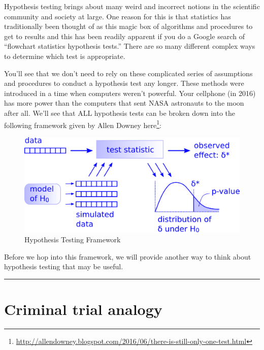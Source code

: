 \documentclass[12pt, krantz2,]{krantz}
\renewcommand{\href}[2]{#2\footnote{\url{#1}}}
\begin{document}
Hypothesis testing brings about many weird and incorrect notions in the scientific community and society at large. One reason for this is that statistics has traditionally been thought of as this magic box of algorithms and procedures to get to results and this has been readily apparent if you do a Google search of ``flowchart statistics hypothesis tests.'' There are so many different complex ways to determine which test is appropriate.

You'll see that we don't need to rely on these complicated series of assumptions and procedures to conduct a hypothesis test any longer. These methods were introduced in a time when computers weren't powerful. Your cellphone (in 2016) has more power than the computers that sent NASA astronauts to the moon after all. We'll see that ALL hypothesis tests can be broken down into the following framework given by Allen Downey \href{http://allendowney.blogspot.com/2016/06/there-is-still-only-one-test.html}{here}:

\begin{figure}

{\centering \includegraphics[width=\textwidth]{images/ht} 

}

\caption{Hypothesis Testing Framework}\label{fig:htdowney}
\end{figure}

Before we hop into this framework, we will provide another way to think about hypothesis testing that may be useful.

\begin{center}\rule{0.5\linewidth}{\linethickness}\end{center}

\hypertarget{trial}{%
\section{Criminal trial analogy}\label{trial}}
\end{document}
